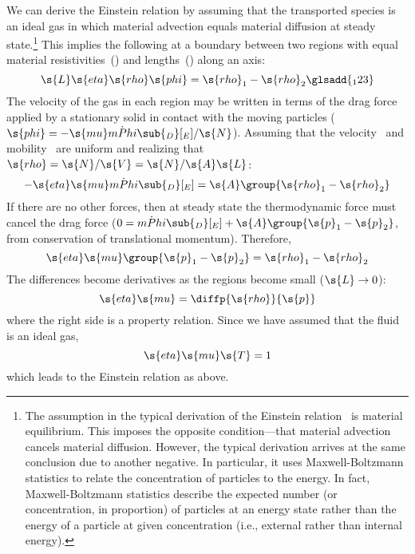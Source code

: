 We can derive the Einstein relation by assuming that the transported species is an ideal gas in which material advection equals material diffusion at steady state.\footnote{The assumption in the typical derivation of the Einstein relation~\cite{Schumacher2002, Kubo1966} is material equilibrium.  This imposes the opposite condition---that material advection cancels material diffusion.  However, the typical derivation arrives at the same conclusion due to another negative.  In particular, it uses Maxwell-Boltzmann statistics to relate the concentration of particles to the energy.  In fact, Maxwell-Boltzmann statistics describe the expected number (or concentration, in proportion) of particles at an energy state rather than the energy of a particle at given concentration (i.e., external rather than internal energy).}  This implies the following at a boundary between two regions with equal material resistivities~() and lengths~() along an axis:
\begin{equation}
  \s{L}\s{eta}\s{rho}\s{phi} = \s{rho}_1 - \s{rho}_2
  \glsadd{_123}
\end{equation}
The velocity of the gas in each region may be written in terms of the drag force applied by a stationary solid in contact with the moving particles ($\s{phi} = -\s{mu}\dot{mPhi}\sub{_D}[_E]/\s{N}$).  Assuming that the velocity~ and mobility~ are uniform and realizing that $\s{rho} = \s{N}/\s{V} = \s{N}/\s{A}\s{L}$:
\begin{equation}
  -\s{eta}\s{mu}\dot{mPhi}\sub{_D}[_E] = \s{A}\group{\s{rho}_1 - \s{rho}_2}
\end{equation}
If there are no other forces, then at steady state the thermodynamic force must cancel the drag force ($0 = \dot{mPhi}\sub{_D}[_E] + \s{A}\group{\s{p}_1 - \s{p}_2}$, from conservation of translational momentum).  Therefore,
\begin{equation}
  \s{eta}\s{mu}\group{\s{p}_1 - \s{p}_2} = \s{rho}_1 - \s{rho}_2
\end{equation}
The differences become derivatives as the regions become small ($\s{L} \to 0$):
\begin{equation}
  \s{eta}\s{mu} = \diffp{\s{rho}}{\s{p}}
\end{equation}
where the right side is a property relation.  Since we have assumed that the fluid is an ideal gas,
\begin{equation}
  \s{eta}\s{mu}\s{T} = 1
\end{equation}
which leads to the Einstein relation as above.
